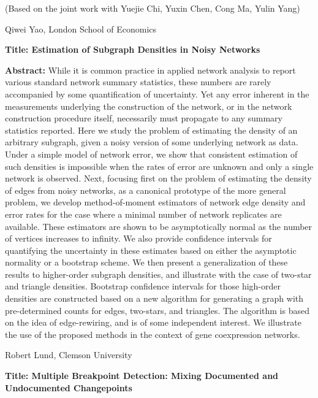 \documentclass[11pt]{article}
\begin{document}
(Based on the joint work with Yuejie Chi, Yuxin Chen, Cong Ma, Yulin
Yang)

\newpage

{\large \sc Qiwei Yao, London School of Economics}


{\bf Title: Estimation of Subgraph Densities in Noisy Networks}

{\bf Abstract:} While it is common practice in applied network
analysis to report various standard network summary statistics, these
numbers are rarely accompanied by some quantification of uncertainty.
Yet any error inherent in the measurements underlying the construction
of the network, or in the network construction procedure itself,
necessarily must propagate to any summary statistics reported.  Here
we study the problem of estimating the density of an arbitrary
subgraph, given a noisy version of some underlying network as data.
Under a simple model of network error, we show that consistent
estimation of such densities is impossible when the rates of error are
unknown and only a single network is observed.  Next, focusing first
on the problem of estimating the density of edges from noisy networks,
as a canonical prototype of the more general problem, we develop
method-of-moment estimators of network edge density and error rates
for the case where a minimal number of network replicates are
available.  These estimators are shown to be asymptotically normal as
the number of vertices increases to infinity.  We also provide
confidence intervals for quantifying the uncertainty in these
estimates based on either the asymptotic normality or a bootstrap
scheme. We then present a generalization of these results to
higher-order subgraph densities, and illustrate with the case of
two-star and triangle densities.  Bootstrap confidence intervals for
those high-order densities are constructed based on a new algorithm
for generating a graph with pre-determined counts for edges,
two-stars, and triangles. The algorithm is based on the idea of
edge-rewiring, and is of some independent interest.  We illustrate the
use of the proposed methods in the context of gene coexpression
networks.

\newpage

{\large \sc Robert Lund, Clemson University}


{\bf Title: Multiple Breakpoint Detection: Mixing Documented and
  Undocumented Changepoints}
\end{document}

